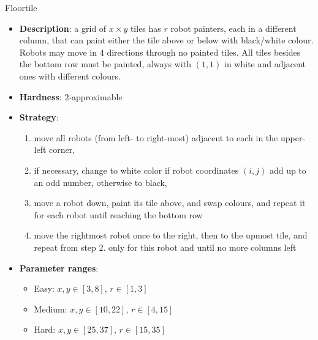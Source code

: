 \documentclass[aspectratio=169,xcolor=dvipsnames]{beamer}
\begin{document}
\begin{frame}{Floortile}

    \begin{itemize}
        \item \textbf{Description}: a grid of $x\times y$ tiles has $r$ robot painters, each in a different column, that can paint either the tile above or below with black/white colour. Robots may move in $4$ directions through no painted tiles. All tiles besides the bottom row must be painted, always with $(1,1)$ in white and adjacent ones with different colours.
        \item \textbf{Hardness}: $2$-approximable  %
        \item \textbf{Strategy}:
        \begin{enumerate}
            \item move all robots (from left- to right-most) adjacent to each in the upper-left corner,
            \item if necessary, change to white color if robot coordinates $(i,j)$ add up to an odd number, otherwise to black,
            \item move a robot down, paint its tile above, and swap colours, and repeat it for each robot until reaching the bottom row
            \item move the rightmost robot once to the right, then to the upmost tile, and repeat from step 2. only for this robot and until no more columns left
        \end{enumerate}
        \item \textbf{Parameter ranges}:
        \begin{itemize}
            \item Easy: $x,y \in [3,8]$, $r \in [1,3]$
            \item Medium: $x,y \in [10,22]$, $r \in [4,15]$
            \item Hard: $x,y \in [25,37]$, $r \in [15,35]$
        \end{itemize}
    \end{itemize}

\end{frame}
\end{document}
